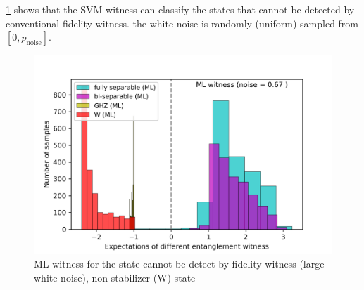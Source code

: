 \documentclass[
reprint,
aps,
pra,
floatfix,
]{revtex4-2}
\theoremstyle{plain}
\theoremstyle{definition}
\newcommand{\noise}{\text{noise}}
\begin{document}

\cref{fig:ml_compare} shows that the SVM witness can classify the states that cannot be detected by conventional fidelity witness.
the white noise is randomly (uniform) sampled from $[0,p_{\noise}]$.

\begin{figure}[!ht]
	\centering
		\includegraphics[width=.9\linewidth]{./Code/three_qubit_hist_ML.png}
	\caption{ML witness for the state cannot be detect by fidelity witness (large white noise), non-stabilizer (W) state}
	\label{fig:ml_compare}
\end{figure}
\end{document}
